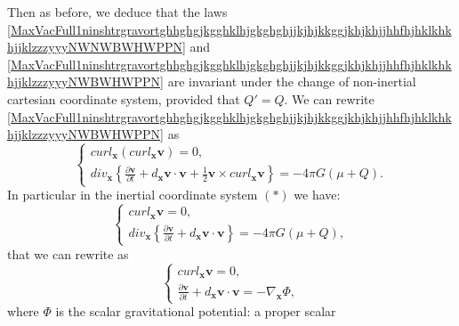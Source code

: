 \documentclass{article}
\theoremstyle{definition}
\theoremstyle{remark}
\renewcommand{\vec}[1]{\mathbf{#1}}
\newcommand{\er}{\eqref}
\newcommand{\er}{\eqref}
\begin{document}
%
%
%
Then as before, we deduce that the laws
\er{MaxVacFull1ninshtrgravortghhghgjkgghklhjgkghghjjkjhjkkggjkhjkhjjhhfhjhklkhkhjjklzzzyyyNWNWBWHWPPN}
and
\er{MaxVacFull1ninshtrgravortghhghgjkgghklhjgkghghjjkjhjkkggjkhjkhjjhhfhjhklkhkhjjklzzzyyyNWBWHWPPN}
are invariant under the change of non-inertial cartesian coordinate
system, provided that $Q'=Q$. We can rewrite
\er{MaxVacFull1ninshtrgravortghhghgjkgghklhjgkghghjjkjhjkkggjkhjkhjjhhfhjhklkhkhjjklzzzyyyNWBWHWPPN}
as
\begin{equation}
\label{MaxVacFull1ninshtrgravortghhghgjkgghklhjgkghghjjkjhjkkggjkhjkhjjhhfhjhklkhkhjjklzzzyyyhjfgfkjgjNWBWHWPPN}
\begin{cases}
curl_{\vec x}\left(curl_{\vec x}\vec v\right)= 0,\\
div_{\vec x}\left\{\frac{\partial\vec v}{\partial t}+d_\vec x\vec
v\cdot\vec v+\frac{1}{2}\vec v\times curl_{\vec x}\vec v\right\}
= -4\pi G(\mu+Q).
\end{cases}
\end{equation}
In particular in the inertial coordinate system $(*)$ we have:
\begin{equation}
\label{MaxVacFull1ninshtrgravortghhghgjkgghklhjgkghghjjkjhjkkggjkhjkhjjhhfhjhklkhkhjjklzzzyyyhjggjhgghhjhNWBWHWPPN}
\begin{cases}
curl_{\vec x}\vec v= 0,\\
div_{\vec x}\left\{\frac{\partial\vec v}{\partial t}+d_\vec x\vec
v\cdot\vec v\right\}= -4\pi G(\mu+Q),
\end{cases}
\end{equation}
that we can rewrite as
\begin{equation}
\label{MaxVacFull1ninshtrgravortghhghgjkgghklhjgkghghjjkjhjkkggjkhjkhjjhhfhjhklkhkhjjklzzzyyyhjggjhgghhjhNWNWBWHWPPN}
\begin{cases}
curl_{\vec x}\vec v= 0,\\
\frac{\partial\vec v}{\partial t}+d_\vec x\vec v\cdot\vec v=
-\nabla_{\vec x}\Phi,
\end{cases}
\end{equation}
where $\Phi$ is the scalar gravitational potential: a proper scalar
\end{document}
